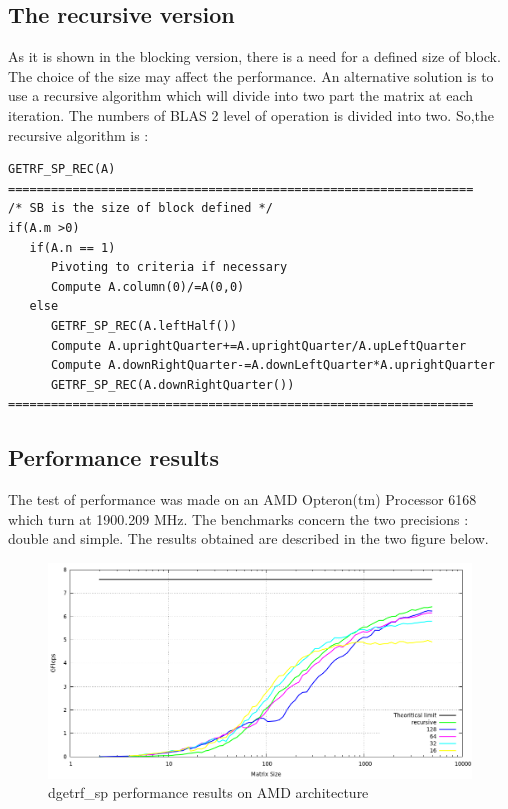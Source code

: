 \documentclass{report}
\begin{document}
\subsection{The recursive version}
As it is shown in the blocking version, there is a need for a defined size of block. The choice of the size may affect the performance. An alternative solution is to use a recursive algorithm which will divide into two part the matrix at each iteration. The numbers of BLAS 2 level of operation is divided into two. So,the recursive algorithm is :

\begin{verbatim}
GETRF_SP_REC(A)
=================================================================
/* SB is the size of block defined */
if(A.m >0)
   if(A.n == 1)
      Pivoting to criteria if necessary
      Compute A.column(0)/=A(0,0)
   else
      GETRF_SP_REC(A.leftHalf())
      Compute A.uprightQuarter+=A.uprightQuarter/A.upLeftQuarter
      Compute A.downRightQuarter-=A.downLeftQuarter*A.uprightQuarter
      GETRF_SP_REC(A.downRightQuarter())
=================================================================
\end{verbatim}


\subsection{Performance results}
The test of performance was made on an AMD Opteron(tm) Processor 6168
which turn at 1900.209 MHz. The benchmarks concern the two precisions : double and simple. The results obtained are described in the two figure below.
\begin{figure}[!ht]
\begin{center}
\includegraphics[width=\textwidth]{exp_dgetrf_sp_amd.png} 
\end{center}
\caption{dgetrf\_sp performance results on AMD architecture}
\end{figure}
\end{document}
